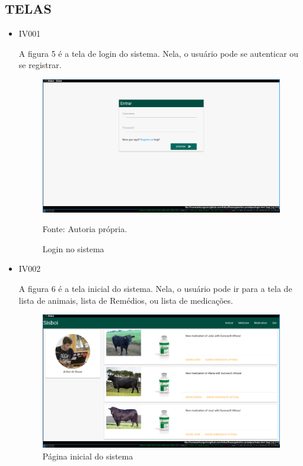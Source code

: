 \subsection{TELAS}

\begin{itemize}
\item IV001

A figura 5 é a tela de login do sistema. Nela, o usuário pode se autenticar ou se registrar.
\begin{figure}[H]
	\begin{center}
		\caption{Login no sistema}
		\includegraphics[width=\textwidth]{../img/prototipos/login.png}

		Fonte: Autoria própria.
	\end{center}
\end{figure}

\item IV002

A figura 6 é a tela inicial do sistema. Nela, o usuário pode ir para a tela de lista de animais, lista de Remédios, ou lista de medicações.
\begin{figure}[H]
	\begin{center}
		\caption{Página inicial do sistema}
		\includegraphics[width=\textwidth]{../img/prototipos/index.png}


\end{center}
\end{figure}
\end{itemize}
